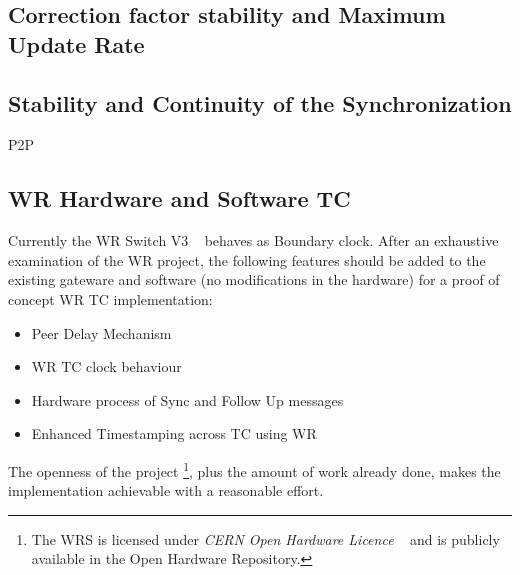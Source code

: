 \subsection{Correction factor stability and Maximum Update Rate}


\subsection{Stability and Continuity of the Synchronization}

P2P

\subsection{WR Hardware and Software TC}

Currently the WR Switch V3 ~\cite{biblio:wrswitch} behaves as Boundary clock.
After an exhaustive examination of the WR project, the following features should be 
added to the existing gateware and software (no modifications in the hardware)
for a proof of concept WR TC implementation:

\begin{itemize}
    \item Peer Delay Mechanism 
    \item WR TC clock behaviour   
    \item Hardware process of Sync and Follow Up messages
    \item Enhanced Timestamping across TC using WR
\end{itemize}

The openness of the project \footnote{The WRS is licensed under \textit{CERN Open Hardware Licence}
~\cite{biblio:lic}  and is publicly available in the Open Hardware Repository.},
plus the amount of work already done, makes the implementation achievable with a
reasonable effort.


\FloatBarrier
